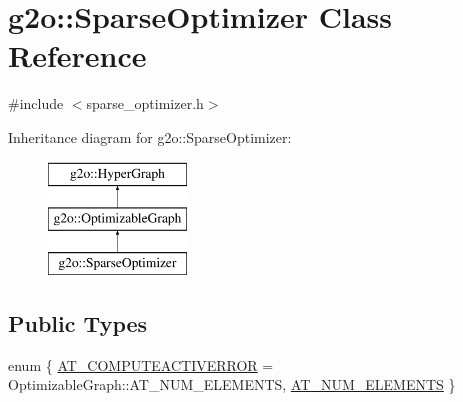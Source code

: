 \hypertarget{classg2o_1_1_sparse_optimizer}{}\section{g2o\+:\+:Sparse\+Optimizer Class Reference}
\label{classg2o_1_1_sparse_optimizer}


{\ttfamily \#include $<$sparse\+\_\+optimizer.\+h$>$}

Inheritance diagram for g2o\+:\+:Sparse\+Optimizer\+:\begin{figure}[H]
\begin{center}
\leavevmode
\includegraphics[height=3.000000cm]{classg2o_1_1_sparse_optimizer}
\end{center}
\end{figure}
\subsection*{Public Types}
\begin{DoxyCompactItemize}
\item 
enum \{ \mbox{\hyperlink{classg2o_1_1_sparse_optimizer_a085529b092eb7fe4970e0cd6c3bd18bfa040ef6eacdbc7ede37bc5280dc5a2814}{A\+T\+\_\+\+C\+O\+M\+P\+U\+T\+E\+A\+C\+T\+I\+V\+E\+R\+R\+OR}} = Optimizable\+Graph\+:\+:A\+T\+\_\+\+N\+U\+M\+\_\+\+E\+L\+E\+M\+E\+N\+TS, 
\mbox{\hyperlink{classg2o_1_1_sparse_optimizer_a085529b092eb7fe4970e0cd6c3bd18bfa9e4fe5403aed6a2ac8b31651c9379098}{A\+T\+\_\+\+N\+U\+M\+\_\+\+E\+L\+E\+M\+E\+N\+TS}}
 \}
\end{DoxyCompactItemize}
